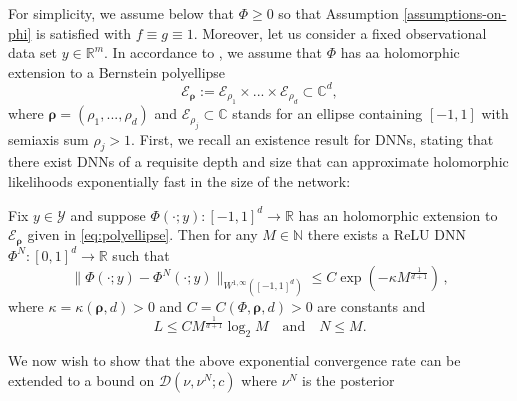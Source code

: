 \documentclass[final]{siamart171218}
\newcommand{\fh}[1]{{\color{blue} #1}}
\newcommand{\mcl}{\mathcal}
\newcommand{\mbb}{\mathbb}
\newcommand{\R}{\mbb{R}}
\newcommand{\mY}{\mcl{Y}}
\newcommand{\K}{\mathcal{D}}
\begin{document}
For simplicity, we assume below that $\Phi\geq 0$ so that
Assumption \ref{assumptions-on-phi} is satisfied with $f\equiv g\equiv 1$. Moreover, let us consider 
a fixed observational data set $y \in \R^m$. 
In accordance to \cite{opschoor2022exponential}, we assume that $\Phi$ has aa holomorphic extension to a Bernstein polyellipse
\begin{equation}
    \label{eq:polyellipse}
    {\mathcal E}_{\boldsymbol{\rho}} := {\mathcal E}_{\rho_1} \times ... \times {\mathcal E}_{\rho_d} \subset {\mathbb C}^d,
\end{equation}
where $\boldsymbol{\rho} = (\rho_1, ..., \rho_d)$ and ${\mathcal E}_{\rho_j} \subset \mathbb{C}$ stands for an ellipse containing $[-1,1]$ with semiaxis sum $\rho_j>1$.
First, we recall an existence  result for DNNs, stating that there exist DNNs of a 
requisite depth and size that can approximate holomorphic likelihoods exponentially fast 
in the size of the network:
\begin{proposition}
\label{thm:hermann}
Fix $y\in\mY$ and
suppose $\Phi(\cdot;y) : [-1,1]^d \to \R$ has an holomorphic extension to ${\mathcal E}_{\boldsymbol{\rho}}$ given in \eqref{eq:polyellipse}. 
Then for any $M\in \mathbb{N}$ there exists a ReLU DNN $\Phi^N : [0, 1]^d \to \R$ such that
\begin{equation*}
	\|\Phi(\cdot; y) - \Phi^N(\cdot;y)\|_{W^{1,\infty}([-1,1]^d)}\leq C \exp(-\kappa M^{\frac 1{d+1}})\,,
\end{equation*}
where $\kappa = \kappa(\boldsymbol{\rho}, d) > 0$
and $C = C(\Phi, \boldsymbol{\rho}, d)>0$ are constants and 
\begin{equation*}
	L \leq CM^{\frac 1{d+1}} \log_2 M \quad \text{and} \quad 
	N  \leq M.
\end{equation*}
\end{proposition}
We now wish to show that the above exponential convergence rate can be extended 
to a bound on $\K(\nu, \nu^N; c)$ where $\nu^N$ is the posterior 
\end{document}
